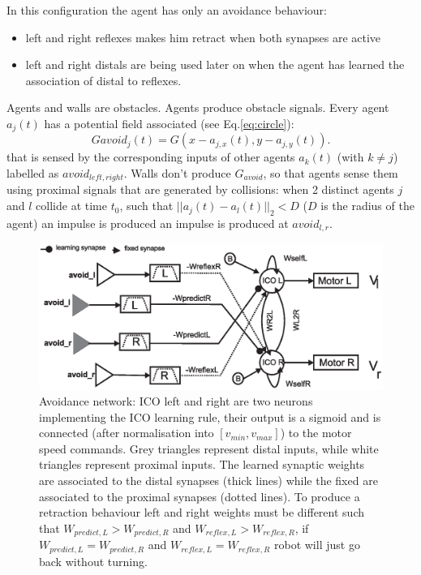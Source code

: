 In this configuration the agent has only an avoidance behaviour:
\begin{itemize}
\item left and right reflexes makes him retract when both synapses are active
\item left and right distals are being used later on when the agent has learned
the association of distal to reflexes.
\end{itemize}

Agents and walls are obstacles. Agents produce obstacle signals.
Every agent $a_{j}(t)$ has a potential field associated (see Eq.\ref{eq:circle}):
\begin{equation}
Gavoid_{j}(t)=G(x-a_{j,x}(t),y-a_{j,y}(t)).
\end{equation}
that is sensed by the corresponding inputs of other agents $a_{k}(t)$
(with $k\neq j$) labelled as $avoid_{left,right}$. Walls
don't produce $G_{avoid}$, so that agents sense them using proximal signals that are
generated by collisions: when 2 distinct agents $j$ and $l$ collide at time $t_{0}$, such
that $||a_{j}(t)-a_{l}(t)||_{2}<D$ ($D$ is the radius of the
agent) an impulse is produced an impulse is produced at $avoid_{l,r}$.
\begin{figure}[htb]
\begin{center}
\includegraphics[scale=0.45]{figures/infomeasure/avoidance.eps}
\end{center}
\vspace*{4pt}
\small{
\caption[Avoidance ICO behaviour]{
Avoidance network: ICO left and right are two neurons implementing the
ICO learning rule, their output is a sigmoid and is connected (after
normalisation into $[v_{min},v_{max}]$) to the motor speed commands.
Grey triangles represent distal inputs, while white triangles represent
proximal inputs. The learned synaptic weights are associated to the distal
synapses (thick lines) while the fixed are associated to the proximal synapses
(dotted lines). To produce a retraction behaviour left and right weights
must be different such that
$W_{predict,L}>W_{predict,R}$ and $W_{reflex,L}>W_{reflex,R}$, if
$W_{predict,L}=W_{predict,R}$ and $W_{reflex,L}=W_{reflex,R}$ robot
will just go back without turning.\label{fig:inputcorr:avoidance}}}
\end{figure}
